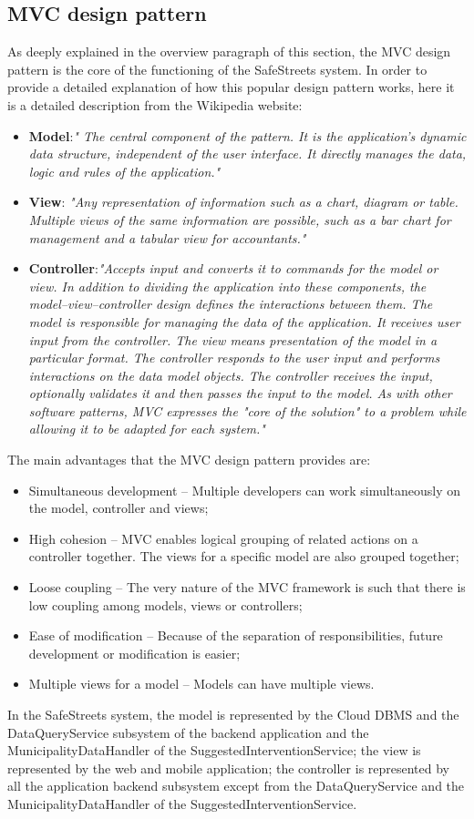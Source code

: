 \subsection{MVC design pattern}
As deeply explained in the overview paragraph of this section, the MVC design pattern is the core of the functioning of the SafeStreets system.
In order to provide a detailed explanation of how this popular design pattern works, here it is a detailed description from the  Wikipedia website:
\begin{itemize}
    \item \textbf{Model}:\textit{" The central component of the pattern. It is the application's dynamic data structure, independent of the user interface. It directly manages the data, logic and rules of the application."}
    \item \textbf{View}: \textit{"Any representation of information such as a chart, diagram or table. Multiple views of the same information are possible, such as a bar chart for management and a tabular view for accountants."}
    \item \textbf{Controller}:\textit{"Accepts input and converts it to commands for the model or view.
    In addition to dividing the application into these components, the model–view–controller design defines the interactions between them.
    The model is responsible for managing the data of the application. It receives user input from the controller.
    The view means presentation of the model in a particular format.
    The controller responds to the user input and performs interactions on the data model objects. The controller receives the input, optionally validates it and then passes the input to the model.
    As with other software patterns, MVC expresses the "core of the solution" to a problem while allowing it to be adapted for each system."}
\end{itemize}
The main advantages that the MVC design pattern provides are:
\begin{itemize}
    \item Simultaneous development – Multiple developers can work simultaneously on the model, controller and views;
    \item High cohesion – MVC enables logical grouping of related actions on a controller together. The views for a specific model are also grouped together;
    \item Loose coupling – The very nature of the MVC framework is such that there is low coupling among models, views or controllers;
    \item Ease of modification – Because of the separation of responsibilities, future development or modification is easier;
    \item Multiple views for a model – Models can have multiple views.
\end{itemize}
In the SafeStreets system, the model is represented by the Cloud DBMS and the DataQueryService subsystem of the backend application and the MunicipalityDataHandler of the SuggestedInterventionService;
the view is represented by the web and mobile application; the controller is represented by all the application backend subsystem except from the DataQueryService and the MunicipalityDataHandler of the SuggestedInterventionService.
